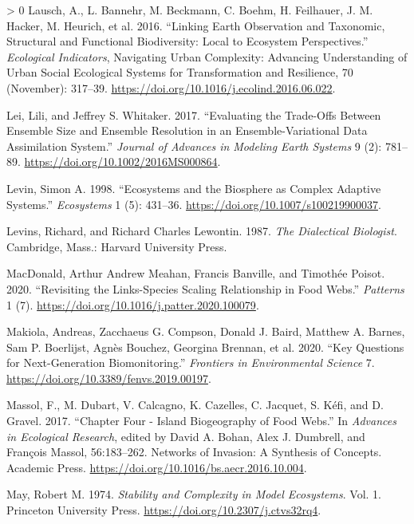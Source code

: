 \documentclass[10pt,oneside]{article}
\newlength{\cslhangindent}
\newenvironment{CSLReferences}[3] %
 {%
  \setlength{\parindent}{0pt}
  \ifodd #1 \everypar{\setlength{\hangindent}{\cslhangindent}}\ignorespaces\fi
  \ifnum #2 > 0
  \setlength{\parskip}{#2\baselineskip}
  \fi
 }%
 {}
\begin{document}
\begin{CSLReferences}{1}{0}
\leavevmode\hypertarget{ref-Lausch2016LinEar}{}%
Lausch, A., L. Bannehr, M. Beckmann, C. Boehm, H. Feilhauer, J. M.
Hacker, M. Heurich, et al. 2016. {``Linking Earth Observation and
Taxonomic, Structural and Functional Biodiversity: Local to Ecosystem
Perspectives.''} \emph{Ecological Indicators}, Navigating Urban
Complexity: Advancing Understanding of Urban Social Ecological Systems
for Transformation and Resilience, 70 (November): 317--39.
\url{https://doi.org/10.1016/j.ecolind.2016.06.022}.

\leavevmode\hypertarget{ref-Lei2017EvaTra}{}%
Lei, Lili, and Jeffrey S. Whitaker. 2017. {``Evaluating the Trade-Offs
Between Ensemble Size and Ensemble Resolution in an Ensemble-Variational
Data Assimilation System.''} \emph{Journal of Advances in Modeling Earth
Systems} 9 (2): 781--89. \url{https://doi.org/10.1002/2016MS000864}.

\leavevmode\hypertarget{ref-Levin1998EcoBio}{}%
Levin, Simon A. 1998. {``Ecosystems and the Biosphere as Complex
Adaptive Systems.''} \emph{Ecosystems} 1 (5): 431--36.
\url{https://doi.org/10.1007/s100219900037}.

\leavevmode\hypertarget{ref-Levins1987DiaBio}{}%
Levins, Richard, and Richard Charles Lewontin. 1987. \emph{The
Dialectical Biologist}. Cambridge, Mass.: Harvard University Press.

\leavevmode\hypertarget{ref-MacDonald2020RevLin}{}%
MacDonald, Arthur Andrew Meahan, Francis Banville, and Timothée Poisot.
2020. {``Revisiting the Links-Species Scaling Relationship in Food
Webs.''} \emph{Patterns} 1 (7).
\url{https://doi.org/10.1016/j.patter.2020.100079}.

\leavevmode\hypertarget{ref-Makiola2020KeyQue}{}%
Makiola, Andreas, Zacchaeus G. Compson, Donald J. Baird, Matthew A.
Barnes, Sam P. Boerlijst, Agnès Bouchez, Georgina Brennan, et al. 2020.
{``Key Questions for Next-Generation Biomonitoring.''} \emph{Frontiers
in Environmental Science} 7.
\url{https://doi.org/10.3389/fenvs.2019.00197}.

\leavevmode\hypertarget{ref-Massol2017ChaFou}{}%
Massol, F., M. Dubart, V. Calcagno, K. Cazelles, C. Jacquet, S. Kéfi,
and D. Gravel. 2017. {``Chapter Four - Island Biogeography of Food
Webs.''} In \emph{Advances in Ecological Research}, edited by David A.
Bohan, Alex J. Dumbrell, and François Massol, 56:183--262. Networks of
Invasion: A Synthesis of Concepts. Academic Press.
\url{https://doi.org/10.1016/bs.aecr.2016.10.004}.

\leavevmode\hypertarget{ref-May1974StaCom}{}%
May, Robert M. 1974. \emph{Stability and Complexity in Model
Ecosystems}. Vol. 1. Princeton University Press.
\url{https://doi.org/10.2307/j.ctvs32rq4}.


\end{CSLReferences}
\end{document}
